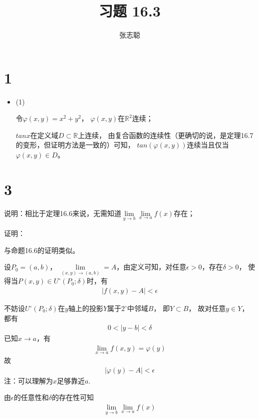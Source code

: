 \documentclass{article}
\begin{document}
\title{习题 16.3}
\author{张志聪}
\maketitle

\section*{1}

\begin{itemize}
  \item (1)

        令$\varphi(x, y) = x^2 + y^2$，
        $\varphi(x, y)$在$\mathbb{R}^2$连续；

        $tan x$在定义域$D \subset \mathbb{R}$上连续，
        由复合函数的连续性（更确切的说，是定理16.7的变形，但证明方法是一致的）可知，
        $tan(\varphi(x, y))$连续当且仅当$\varphi(x, y) \in D$。
\end{itemize}

\section*{3}

说明：相比于定理16.6来说，无需知道$\lim\limits_{y \to b} \lim\limits_{x \to a} f(x)$存在；

证明：

与命题16.6的证明类似。

设$P_0 = (a, b)$，
$\lim\limits_{(x, y) \to (a, b)} = A$，由定义可知，对任意$\epsilon> 0$，存在$\delta > 0$，
使得当$P(x, y) \in U^{\circ}(P_0; \delta)$时，有
\begin{align*}
  |f(x, y) - A| < \epsilon
\end{align*}

不妨设$U^{\circ}(P_0; \delta)$在$y$轴上的投影$Y$属于$2^\circ$中邻域$B$，
即$Y \subset B$，
故对任意$y \in Y$，都有
\begin{align*}
  0 < |y - b| < \delta
\end{align*}
已知$x \to a$，有
\begin{align*}
  \lim\limits_{x \to a} f(x, y) = \varphi(y)
\end{align*}
故
\begin{align*}
  |\varphi(y) - A| < \epsilon
\end{align*}
注：可以理解为$x$足够靠近$a$.

由$\epsilon$的任意性和$\delta$的存在性可知
\begin{align*}
  \lim\limits_{y \to b} \lim\limits_{x \to a} f(x)
\end{align*}
\end{document}
